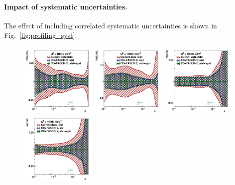 \paragraph{Impact of systematic uncertainties.}
%
The effect of including correlated systematic uncertainties is shown in 
Fig.~\ref{fig:profiling_syst}.
\begin{figure}[t]
\centering
\includegraphics[width=0.32\textwidth]{plots/proton_fasernu2/inclusive+charm_chargediscrimination/syst_FASERv2_q2_10000_pdf_uv_ratio.pdf}
\includegraphics[width=0.32\textwidth]{plots/proton_fasernu2/inclusive+charm_chargediscrimination/syst_FASERv2_q2_10000_pdf_dv_ratio.pdf}
\includegraphics[width=0.32\textwidth]{plots/proton_fasernu2/inclusive+charm_chargediscrimination/syst_FASERv2_q2_10000_pdf_g_ratio.pdf}\\
\includegraphics[width=0.32\textwidth]{plots/proton_fasernu2/inclusive+charm_chargediscrimination/syst_FASERv2_q2_10000_pdf_Sea_ratio.pdf}

\end{figure}
